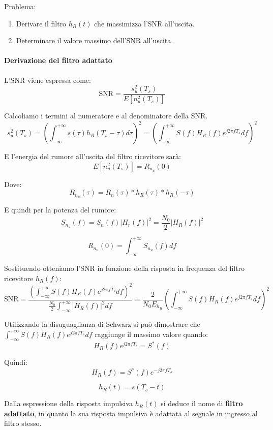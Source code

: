 Problema:
\begin{enumerate}
    \item Derivare il filtro \( h_R(t) \) che massimizza l'SNR all'uscita.
    \item Determinare il valore massimo dell'SNR all'uscita.
\end{enumerate}


\paragraph*{Derivazione del filtro adattato}

L'SNR viene espressa come:
\[
\text{SNR} = \frac{s_u^2(T_s)}{E[n_u^2(T_s)]}
\]

Calcoliamo i termini al numeratore e al denominatore della SNR.
\[
s_u^2(T_s) = \left( \int_{-\infty}^{+\infty} s(\tau) h_R(T_s - \tau) d\tau \right)^2 = \left( \int_{-\infty}^{+\infty} S(f) H_R(f) e^{j2\pi fT_s} df \right)^2
\]

E l'energia del rumore all'uscita del filtro ricevitore sarà:
\[
E[n_u^2(T_s)] = R_{n_u}(0)
\]

Dove:
\[
R_{n_u}(\tau) = R_n(\tau) \ast h_R(\tau) \ast h_R(-\tau)
\]

E quindi per la potenza del rumore:
\[
S_{n_u}(f) = S_n(f) \left| H_r(f) \right|^2 = \frac{N_0}{2} \left| H_R(f) \right|^2
\]

\[
R_{n_u}(0) = \int_{-\infty}^{+\infty} S_{n_u}(f) df
\]

Sostituendo otteniamo l'SNR in funzione della risposta in frequenza del filtro ricevitore \( h_R(f) \):
\[
\text{SNR} = \frac{\left( \int_{-\infty}^{+\infty} S(f) H_R(f) e^{j2\pi fT_s} df \right)^2}{\frac{N_0}{2} \int_{-\infty}^{+\infty} \left| H_R(f) \right|^2 df} = \frac{2}{N_0 E_{h_R}} \left( \int_{-\infty}^{+\infty} S(f) H_R(f) e^{j2\pi fT_s} df \right)^2
\]

Utilizzando la disuguaglianza di Schwarz si può dimostrare che $\int_{-\infty}^{+\infty} S(f) H_R(f) e^{j2\pi fT_s} df$ raggiunge il massimo valore quando:
\[
H_R(f) e^{j2\pi fT_s} = S^*(f)
\]

Quindi:
\[
H_R(f) = S^*(f) e^{-j2\pi fT_s}
\]

\[
\boxed{h_R(t) = s(T_s - t)}
\]

Dalla espressione della risposta impulsiva \( h_R(t) \) si deduce il nome di \textbf{filtro adattato}, in quanto la sua risposta impulsiva è adattata al segnale in ingresso al filtro stesso.



